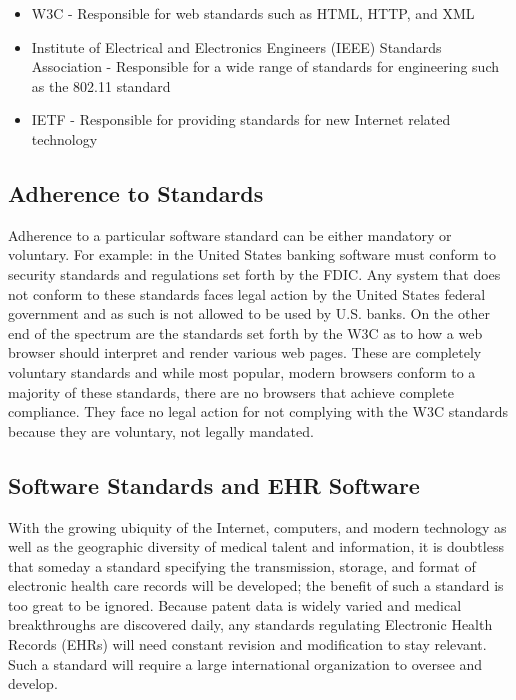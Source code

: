 \documentclass[14pt]{article}
\begin{document}

\begin{itemize}
\item \gls{W3C} - Responsible for web standards such as \gls{HTML}, \gls{HTTP}, and \gls{XML} 
\item Institute of Electrical and Electronics Engineers (\gls{IEEE}) Standards Association - Responsible for a wide range of standards for engineering such as the 802.11 standard
\item \gls{IETF} - Responsible for providing standards for new Internet related technology 
\end{itemize}


\subsection{Adherence to Standards}
Adherence to a particular software standard can be either mandatory or voluntary. For example: in the United States banking software must conform to security standards and regulations set forth by the \gls{FDIC}. Any system that does not conform to these standards faces legal action by the United States federal government and as such is not allowed to be used by U.S. banks. On the other end of the spectrum are the standards set forth by the \gls{W3C} as to how a web browser should interpret and render various web pages. These are completely voluntary standards and while most popular, modern browsers conform to a majority of these standards, there are no browsers that achieve complete compliance. They face no legal action for not complying with the \gls{W3C} standards because they are voluntary, not legally mandated.

\subsection{Software Standards and EHR Software}
With the growing ubiquity of the Internet, computers, and modern technology as well as the geographic diversity of medical talent and information, it is doubtless that someday a standard specifying the transmission, storage, and format of electronic health care records will be developed; the benefit of such a standard is too great to be ignored. Because patent data is widely varied and medical breakthroughs are discovered daily, any standards regulating Electronic Health Records (\glspl{EHR}) will need constant revision and modification to stay relevant. Such a standard will require a large international organization to oversee and develop.
\end{document}
